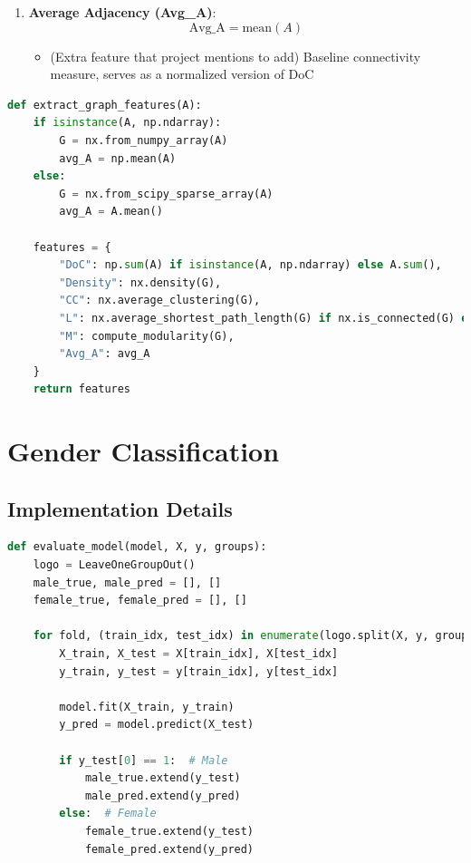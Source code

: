 \documentclass{article}
\begin{document}
\begin{enumerate}
    \item \textbf{Average Adjacency (Avg\_A)}:
    \begin{equation}
        \text{Avg\_A} = \text{mean}(A)
    \end{equation}
    \begin{itemize}
	    \item (Extra feature that project mentions to add) Baseline connectivity measure, serves as a normalized version of DoC
    \end{itemize}
\end{enumerate}




\begin{lstlisting}[language=Python]
def extract_graph_features(A):
    if isinstance(A, np.ndarray):
        G = nx.from_numpy_array(A)
        avg_A = np.mean(A)
    else:
        G = nx.from_scipy_sparse_array(A)
        avg_A = A.mean()
        
    features = {
        "DoC": np.sum(A) if isinstance(A, np.ndarray) else A.sum(),
        "Density": nx.density(G),
        "CC": nx.average_clustering(G),
        "L": nx.average_shortest_path_length(G) if nx.is_connected(G) else np.nan,
        "M": compute_modularity(G),
        "Avg_A": avg_A  
    }
    return features
\end{lstlisting}

\section{Gender Classification}
\subsection{Implementation Details}
\begin{lstlisting}[language=Python]
def evaluate_model(model, X, y, groups):
    logo = LeaveOneGroupOut()
    male_true, male_pred = [], []
    female_true, female_pred = [], []
    
    for fold, (train_idx, test_idx) in enumerate(logo.split(X, y, groups)):
        X_train, X_test = X[train_idx], X[test_idx]
        y_train, y_test = y[train_idx], y[test_idx]
        
        model.fit(X_train, y_train)
        y_pred = model.predict(X_test)
        
        if y_test[0] == 1:  # Male
            male_true.extend(y_test)
            male_pred.extend(y_pred)
        else:  # Female
            female_true.extend(y_test)
            female_pred.extend(y_pred)
\end{lstlisting}
\end{document}
